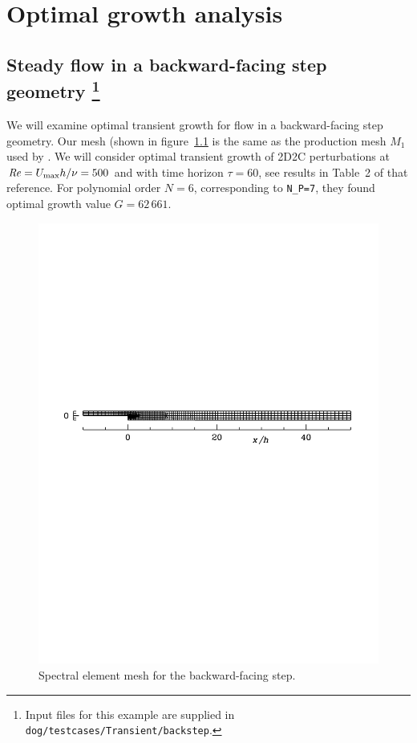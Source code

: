 \documentclass[11pt,a4paper]{report}
\newcommand\Rey{\mbox{\textit{Re}}}
\begin{document}
\chapter{Optimal growth analysis}
\label{ch.tg}


\section{Steady flow in a backward-facing step geometry
\protect\footnote{Input files for this example are supplied in
  \texttt{dog/testcases/Transient/backstep}.}  }
\label{sec.bfsTG}

We will examine optimal transient growth for flow in a backward-facing
step geometry.  Our mesh (shown in figure~\ref{fig.bfsmesh} is the
same as the production mesh $M_1$ used by \citet{bbs08a}.  We will
consider optimal transient growth of 2D2C perturbations at
$\Rey=U_{\max}h/\nu=500$ and with time horizon $\tau=60$, see results
in Table~2 of that reference.  For polynomial order $N=6$,
corresponding to \verb+N_P=7+, they found optimal growth value
$G=62\,661$.

\begin{figure}
\begin{center}
\includegraphics[width=\textwidth]{bfs12mesh}
\end{center}
\caption{Spectral element mesh for the backward-facing step.}
\label{fig.bfsmesh}
\end{figure}
\end{document}
